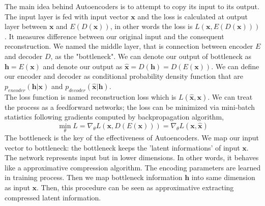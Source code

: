 \documentclass[11pt,twocolumn]{article}
\begin{document}
The main idea behind Autoencoders is to attempt to copy its input to its output. The input layer is fed with input vector $\mathbf{x}$ and the loss is calculated at output layer between $\mathbf{x}$ and $E(D(\mathbf{x}))$, in other words the loss is $L(\mathbf{x},E(D(\mathbf{x})))$. It measures difference between our original input and the consequent reconstruction.  We named the middle layer, that is connection between encoder $E$ and decoder $D$, as the "bottleneck". We can denote our output of bottleneck as $\mathbf{h} = E(\mathbf{x})$ and denote our output as $\mathbf{\hat{x}} = D(\mathbf{h}) = D(E(\mathbf{x}))$. We can define our encoder and decoder as conditional probability density function that are $p_{encoder}(\mathbf{h} | \mathbf{x})$ and $p_{decoder}(\mathbf{\hat{x}} | \mathbf{h})$. \\
The loss function is named reconstruction loss which is $L(\mathbf{\hat{x}},\mathbf{x})$. We can treat the process as a feedforward networks; the loss can be minimized via mini-batch statistics following gradients computed by backpropagation algorithm,
\begin{equation}
\min\limits_{\theta} L = \nabla_\theta L(\mathbf{x}, D(E(\mathbf{x}))) =\nabla_\theta L(\mathbf{x}, \mathbf{\hat{x}})
\end{equation}
The bottleneck is the key of the effectiveness of Autoencoders. We map our input vector to bottleneck: the bottleneck keeps the 'latent informations' of input $\mathbf{x}$. The network represents input but in lower dimensions. In other words, it behaves like a approximative compression algorithm. The encoding parameters are learned in training process. Then we map bottleneck information $\mathbf{h}$ into same dimension as input $\mathbf{x}$. Then, this procedure can be seen as approximative extracting compressed latent information.
\end{document}
